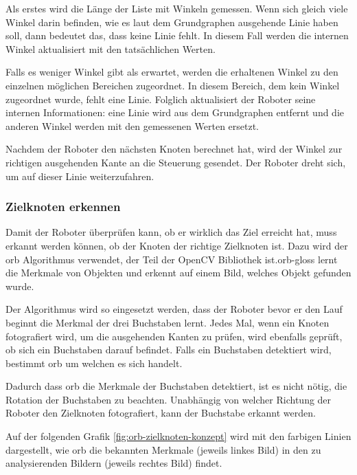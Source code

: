 Als erstes wird die Länge der Liste mit Winkeln gemessen. Wenn sich gleich viele Winkel darin befinden, wie es laut dem Grundgraphen ausgehende Linie haben soll, dann bedeutet das, dass keine Linie fehlt. In diesem Fall werden die internen Winkel aktualisiert mit den tatsächlichen Werten. 

Falls es weniger Winkel gibt als erwartet, werden die erhaltenen Winkel zu den einzelnen möglichen Bereichen zugeordnet. In diesem Bereich, dem kein Winkel zugeordnet wurde, fehlt eine Linie. Folglich aktualisiert der Roboter seine internen Informationen: eine Linie wird aus dem Grundgraphen entfernt und die anderen Winkel werden mit den gemessenen Werten ersetzt.

Nachdem der Roboter den nächsten Knoten berechnet hat, wird der Winkel zur richtigen ausgehenden Kante an die Steuerung gesendet. Der Roboter dreht sich, um auf dieser Linie weiterzufahren.

\subsubsection{Zielknoten erkennen}

Damit der Roboter überprüfen kann, ob er wirklich das Ziel erreicht hat, muss erkannt werden können, ob der Knoten der richtige Zielknoten ist. Dazu wird der \acrfull{orb} Algorithmus verwendet, der Teil der OpenCV Bibliothek ist.\gls{orb-gloss} lernt die Merkmale von Objekten und erkennt auf einem Bild, welches Objekt gefunden wurde.

Der Algorithmus wird so eingesetzt werden, dass der Roboter bevor er den Lauf beginnt die Merkmal der drei Buchstaben lernt. Jedes Mal, wenn ein Knoten fotografiert wird, um die ausgehenden Kanten zu prüfen, wird ebenfalls geprüft, ob sich ein Buchstaben darauf befindet. Falls ein Buchstaben detektiert wird, bestimmt \acrshort{orb} um welchen es sich handelt.

Dadurch dass \acrshort{orb} die Merkmale der Buchstaben detektiert, ist es nicht nötig, die Rotation der Buchstaben zu beachten. Unabhängig von welcher Richtung der Roboter den Zielknoten fotografiert, kann der Buchstabe erkannt werden.

Auf der folgenden Grafik \ref{fig:orb-zielknoten-konzept} wird mit den farbigen Linien dargestellt, wie \acrshort{orb} die bekannten Merkmale (jeweils linkes Bild) in den zu analysierenden Bildern (jeweils rechtes Bild) findet.

